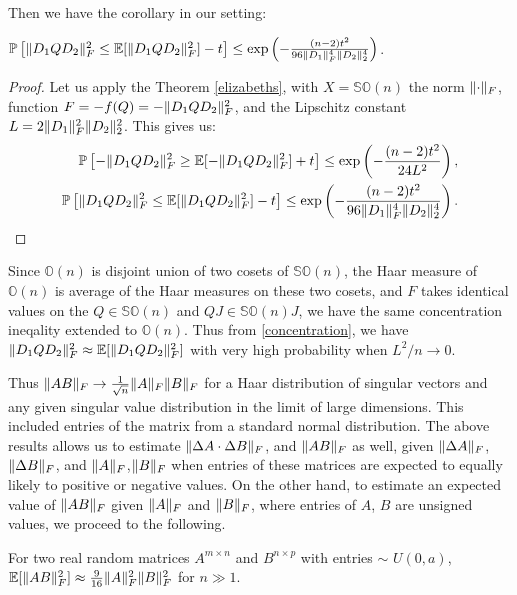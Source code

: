 \documentclass[onefignum,onetabnum]{siamart171218}
\DeclarePairedDelimiter\norm{\lVert}{\rVert}
\begin{document}
Then we have the corollary in our setting:
\begin{corollary}\label{th:concentrationprob}
    $ \mathbb{P} \left[   \norm{D_1 Q D_2}^2_F \leq \mathbb{E}[\norm{D_1 Q D_2}^2_F] - t \right] 
\leq \exp\left( -\frac{(n - 2)t^2}{96 \norm{D_1}^4_F \norm{D_2}_2^4} \right)$.
\end{corollary}

\begin{proof}
Let us apply the Theorem \ref{elizabeths}, with $X = \mathbb{SO}(n)$ the norm $\norm{\cdot}_F$, function $F = - f(Q) = - \norm{D_1 Q D_2}^2_F$, and the Lipschitz constant $L = 2 \norm{D_1}^2_F \norm{D_2}^2_2$. This gives us:
\begin{align}
    \mathbb{P} \left[  - \norm{D_1 Q D_2}^2_F \geq \mathbb{E}[- \norm{D_1 Q D_2}^2_F] + t \right] 
\leq \exp\left( -\frac{(n - 2)t^2}{24L^2} \right), \\
 \mathbb{P} \left[\norm{D_1 Q D_2}^2_F \leq \mathbb{E}[\norm{D_1 Q D_2}^2_F] - t \right] 
\leq \exp\left( -\frac{(n - 2)t^2}{96 \norm{D_1}^4_F \norm{D_2}_2^4} \right) \label{concentration}. 
\end{align}
\end{proof}

Since $\mathbb{O}(n)$ is disjoint union of two cosets of $\mathbb{SO}(n)$, the Haar measure of $\mathbb{O}(n)$ is average of the Haar measures on these two cosets, and $F$ takes identical values on the $Q \in \mathbb{SO}(n)$ and $QJ \in \mathbb{SO}(n)J$, we have the same concentration ineqality extended to $\mathbb{O}(n)$. Thus from \eqref{concentration}, we have ${\norm{D_1 Q D_2}^2_F} \approx \mathbb{E}[\norm{D_1 Q D_2}^2_F]$ with very high probability when $L^2/n \to 0$. 

Thus $\norm{AB}_F \rightarrow \frac{1}{\sqrt{n}}\norm{A}_F \norm{B}_F$ for a Haar distribution of singular vectors and any given singular value distribution in the limit of large dimensions. This included entries of the matrix from a standard normal distribution. The above results allows us to estimate $\norm{\Delta A \cdot \Delta B}_F$, and $\norm{AB}_F$ as well, given $\norm{\Delta A}_F$,$\norm{\Delta B}_F$, and $\norm{A}_F$,$\norm{B}_F$ when entries of these matrices are expected to equally likely to positive or negative values. On the other hand, to estimate an expected value of $\norm{AB}_F$ given $\norm{A}_F$ and $\norm{B}_F$, where entries of $A$, $B$ are unsigned values, we proceed to the following.

\begin{theorem}\label{th:uniform_distribution_norms}
    For two real random matrices $A^{m \times n}$ and $B^{n \times p}$ with entries $\sim$ $U(0,a)$, $\mathbb{E}[\norm{AB}_F^2] \approx \frac{9}{16}\norm{A}_F^2 \norm{B}_F^2$ for $n \gg 1$.
\end{theorem}
\end{document}
